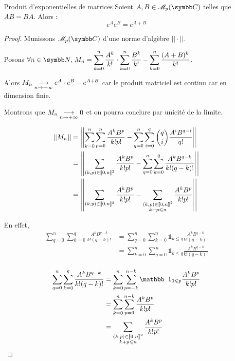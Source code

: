 \begin{corollaire}{Produit d'exponentielles de matrices}{}
    Soient $A, B \in \mathscr M_p(\C)$ telles que $AB = BA$. 
    Alors :
    \[e^A e^B = e^{A + B}\]
\end{corollaire}

\begin{proof}
    Munissons $\mathscr M_p(\C)$ d'une norme d'algèbre $||\cdot||$. 

    Posons $\displaystyle \forall n \in \N, \, M_n = \sum_{k = 0 }^{n } \frac{A^k}{k!} \cdot \sum_{k = 0 }^{n } \frac{B^k}{k!} - \sum_{k = 0 }^{n }\frac{(A + B)^k}{k!}$.

    Alors $M_n \underset{n \to + \infty}{\longrightarrow} e^A \cdot e^B - e^{A + B}$ car le produit matriciel est continu
    car en dimension finie. 

    Montrons que $M_n \underset{n \to + \infty}{\longrightarrow} 0$ et on pourra conclure par unicité de la limite. 

    \begin{align*}
        ||M_n|| & = \left|\left| \sum_{k = 0 }^{n } \sum_{p = 0 }^{n } \frac{A^k B^p}{k! p!} - \sum_{q = 0}^n \sum_{i = 0 }^{q } \binom q i \frac{A^i B^{q - i}}{q!} \right|\right| \\
                & = \left|\left| \sum_{(k, p) \in [\![0, n]\!]^2} \frac{A^k B^p}{k! p!} - \sum_{q = 0}^n \sum_{k = 0}^q \frac{A^k B^{q - k}}{k! (q - k)!} \right|\right| \\
                & = \left|\left| \sum_{(k, p) \in [\![0, n]\!]^2} \frac{A^k B^p}{k! p!} - \sum_{\substack{(k, p) \in [\![0, n]\!]^2 \\ k + p \leqslant n}} \frac{A^k B^p}{k! p!} \right|\right| \\
    \end{align*}

    En effet,
    \begin{align*}
        \sum_{q = 0}^n \sum_{k = 0}^q \frac{A^k B^{q - k}}{k! (q - k)!} & = \sum_{q= 0}^n \sum_{k = 0}^n \mathbb 1_{k \leqslant q} \frac{A^k B^{q - k}}{k! (q - k)!} \\
         & = \sum_{k = 0}^n \sum_{q = 0}^n \mathbb 1_{k \leqslant q} \frac{A^k B^{q - k}}{k! (q - k)!} \\
    \end{align*}

    \begin{align*}
        \sum_{q = 0}^n \sum_{k = 0}^q \frac{A^k B^{q - k}}{k! (q - k)!} & = \sum_{ k = 0}^n \sum_{p = -k}^{n - k} \mathbb 1_{0 \leqslant p} \frac{A^k B^p}{k! p!} \\
         & = \sum_{ k = 0}^n \sum_{p = 0}^{n - k} \frac{A^k B^p}{k! p!} \\
         & = \sum_{\substack{(k, p) \in \ninter 0 n^2 \\ k + p \leqslant n}} \frac{A^k B^p}{k! p!} \\
    \end{align*}


\end{proof}
